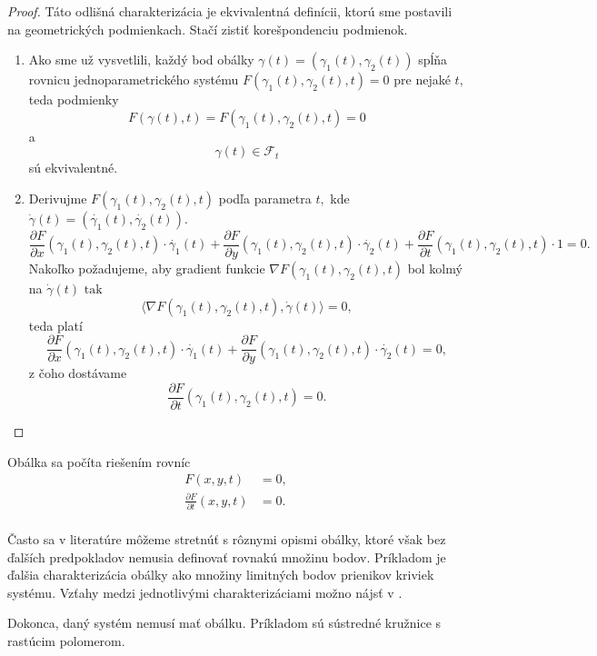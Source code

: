 \begin{proof}
Táto odlišná charakterizácia je ekvivalentná definícii, ktorú sme postavili na geometrických podmienkach. Stačí zistiť korešpondenciu podmienok.
\begin{enumerate}
\item Ako sme už vysvetlili, každý bod obálky ${\gamma}(t) = (\gamma_{1}(t),\gamma_{2}(t))$ spĺňa rovnicu jednoparametrického systému $F(\gamma_{1}(t),\gamma_{2}(t),t)=0$ pre nejaké $t,$ teda podmienky 
$$ F(\gamma(t), t) = F(\gamma_{1}(t), \gamma_{2}(t), t) = 0$$
a
$$\gamma(t) \in \mathcal{F}_{t}$$
sú ekvivalentné.
\item Derivujme $F(\gamma_{1}(t),\gamma_{2}(t), t)$ podľa parametra $t,$ kde $ \dot{\gamma}(t) = ( \dot{\gamma_{1}}(t), \dot{\gamma_{2}}(t) ).$
$$ \frac{\partial F}{\partial x}(\gamma_{1}(t),\gamma_{2}(t),t) \cdot \dot{\gamma_{1}}(t)+\frac{\partial F}{\partial y}(\gamma_{1}(t),\gamma_{2}(t),t) \cdot \dot{\gamma_{2}}(t)+\frac{\partial F}{\partial t}(\gamma_{1}(t),\gamma_{2}(t),t) \cdot 1 = 0. $$
Nakoľko požadujeme, aby gradient funkcie $\nabla F(\gamma_{1}(t),\gamma_{2}(t),t)$ bol kolmý na $\dot{\gamma}(t) \text{ tak}$
$$ \langle \nabla F(\gamma_{1}(t),\gamma_{2}(t),t), \dot{\gamma}(t) \rangle = 0,$$
teda platí
$$ \frac{\partial F}{\partial x}(\gamma_{1}(t),\gamma_{2}(t),t) \cdot \dot{\gamma_{1}}(t)+\frac{\partial F}{\partial y}(\gamma_{1}(t),\gamma_{2}(t),t) \cdot \dot{\gamma_{2}}(t) = 0, $$
z čoho dostávame
$$ \frac{\partial F}{\partial t}(\gamma_{1}(t),\gamma_{2}(t),t) = 0. $$ 
\end{enumerate}
\end{proof}

Obálka sa počíta riešením rovníc
\begin{align*}
F(x, y, t) &= 0, \\
\frac{\partial F}{\partial t}(x,y,t) &= 0. \\
\end{align*}

Často sa v literatúre môžeme stretnúť s rôznymi opismi obálky, ktoré však bez ďalších predpokladov nemusia definovať rovnakú množinu bodov. Príkladom je ďalšia charakterizácia obálky ako množiny limitných bodov prienikov kriviek systému. Vzťahy medzi jednotlivými charakterizáciami možno nájsť v \cite{Bru81}.  

Dokonca, daný systém nemusí mať obálku. Príkladom sú sústredné kružnice s rastúcim polomerom.

